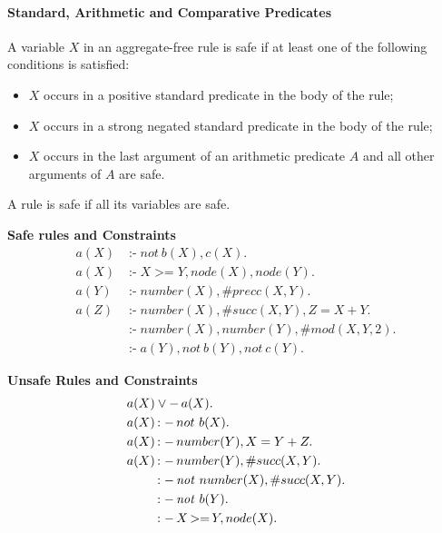 \documentclass[a4paper, titlepage]{article}
\DeclareMathOperator{\leftimpl}{:-}
\DeclareMathOperator{\clasneg}{-}
\DeclareMathOperator{\nott}{\mathit{not}}
\DeclareMathOperator{\geeq}{>=}
\begin{document}
\paragraph{Standard, Arithmetic and Comparative Predicates}
A variable $X$ in an aggregate-free rule is safe if at least one 
of the following conditions is satisfied:
\begin{itemize}
\item $X$ occurs in a positive standard predicate in the 
body of the rule;
\item $X$ occurs in a strong negated standard predicate in 
the body of the rule;
\item $X$ occurs in the last argument of an arithmetic 
predicate $A$ and all other arguments of $A$ are safe.
\end{itemize}
A rule is safe if all its variables are safe.
\begin{exmp} \textbf{Safe rules and Constraints}
\begin{align*}
a(X)& \leftimpl not \ b(X), c(X). \\
a(X)& \leftimpl X \geeq Y, node(X), node(Y).\\
a(Y)& \leftimpl number(X), \#precc(X,Y). \\
a(Z)& \leftimpl number(X), \#succ(X,Y),Z=X+Y.\\
    &\leftimpl number(X), number(Y), \#mod(X,Y,2).\\
    &\leftimpl a(Y), not \ b(Y), not \ c(Y). 
\end{align*}
\end{exmp}

\begin{exmp} \textbf{Unsafe Rules and Constraints}
\begin{align*}
a(X) &\vee \clasneg a(X). \\
a(X)&\leftimpl not \ b(X). \\
a(X)&\leftimpl number(Y), X=Y+Z. \\
a(X)&\leftimpl number(Y), \#succ(X,Y). \\
    & \leftimpl \nott \thinspace number(X), \#succ(X,Y). \\
    & \leftimpl \nott \thinspace b(Y).\\
    & \leftimpl X \geeq Y, node(X). 
\end{align*}
\end{exmp}
\end{document}
